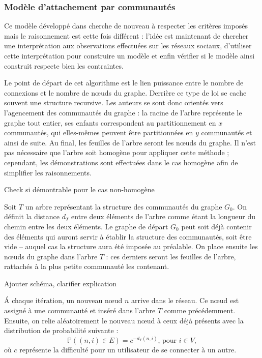 \documentclass[a4paper]{article}
\begin{document}
    \subsubsection{Modèle d'attachement par communautés}
    Ce modèle développé dans \cite{Leskovec:2007:GED:1217299.1217301} cherche
    de nouveau à respecter les critères imposés mais le raisonnement est cette
    fois différent : l'idée est maintenant de chercher une interprétation aux
    observations effectuées sur les réseaux sociaux, d'utiliser cette
    interprétation pour construire un modèle et enfin vérifier si le modèle
    ainsi construit respecte bien les contraintes.

    Le point de départ de cet algorithme est le lien puissance entre le nombre
    de connexions et le nombre de n\oe{}uds du graphe. Derrière ce type de loi
    se cache souvent une structure recursive. Les auteurs se sont donc orientés
    vers l'agencement des communautés du graphe : la racine de l'arbre
    représente le graphe tout entier, ses enfants correspondent au
    partitionnement en $x$ communautés, qui elles-mêmes peuvent être
    partitionnées en $y$ communautés et ainsi de suite. Au final, les feuilles
    de l'arbre seront les n\oe{}uds du graphe. Il n'est pas nécessaire que
    l'arbre soit homogène pour appliquer cette méthode ; cependant, les
    démonstrations sont effectuées dans le cas homogène afin de simplifier
    les raisonnements.
\begin{todo}
Check si démontrable pour le cas non-homogène
\end{todo}
    Soit $T$ un arbre représentant la structure des communautés du graphe $G_0$.
    On définit la distance $d_T$ entre deux éléments de l'arbre comme étant la
    longueur du chemin entre les deux éléments. Le graphe de départ $G_0$ peut
    soit déjà contenir des éléments qui auront servir à établir la structure
    des communautés, soit être vide -- auquel cas la structure aura été
    imposée au préalable.
    On place ensuite les n\oe{}uds du graphe dans l'arbre $T$ : ces derniers
    seront les feuilles de l'arbre, rattachés à la plus petite communauté les
    contenant.
\begin{todo}
Ajouter schéma, clarifier explication
\end{todo}
    \'A chaque itération, un nouveau n\oe{}ud $n$ arrive dans le réseau. Ce
    n\oe{}ud est assigné à une communauté et inséré dans l'arbre $T$ comme
    précédemment. Ensuite, on relie aléatoirement le nouveau n\oe{}ud à ceux
    déjà présents avec la distribution de probabilité suivante :
    \[
        \mathbb{P}\left((n, i) \in E  \right) = c^{-d_T(n, i)} \text{, pour } i \in V,
    \]
    où $c$ représente la difficulté pour un utilisateur de se connecter à un
    autre.
\end{document}
